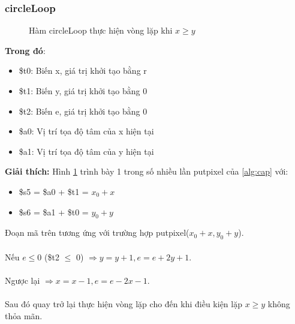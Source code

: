 \documentclass[a4paper,12pt]{article}
\begin{document}
    \subsubsection{circleLoop}
    \FloatBarrier
    \begin{figure}[ht!]
    	\centerline{}
    	\caption{Hàm circleLoop thực hiện vòng lặp khi $x \geq y$}
    	\label{fig:bai100}
    \end{figure}
    \noindent
    \textbf{Trong đó}:
    \begin{itemize}
        \item \$t0: Biến x, giá trị khởi tạo bằng r
        \item \$t1: Biến y, giá trị khởi tạo bằng 0
        \item \$t2: Biến e, giá trị khởi tạo bằng 0
        \item \$a0: Vị trí tọa độ tâm của x hiện tại 
        \item \$a1: Vị trí tọa độ tâm của y hiện tại
    \end{itemize}
    \textbf{Giải thích:}
    Hình \ref{fig:bai100} trình bày 1 trong số nhiều lần putpixel của  \ref{alg:cap} với:
    \begin{itemize}
        \item \$s5 = \$a0 + \$t1 = $x_0 + x$
        \item \$s6 = \$a1 + \$t0 = $y_0 + y$
    \end{itemize}
    Đoạn mã trên tương ứng với trường hợp putpixel($x_0+x,y_0+y$). \\ \\
    \textsf{Nếu} $e \leq 0$ (\$t2 $\leq$ 0) $\Rightarrow y = y + 1, e = e + 2y + 1$. \\ \\
    \textsf{Ngược lại} $\Rightarrow x = x - 1, e = e - 2x - 1$.  \\ \\
    Sau đó quay trở lại thực hiện vòng lặp cho đến khi điều kiện lặp $x \geq y$ không thỏa mãn.
\end{document}
